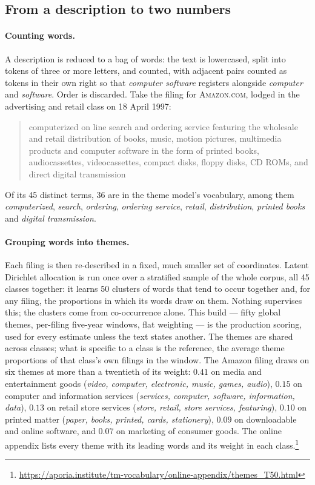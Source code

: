 \subsection{From a description to two numbers}\label{sec:definitions}

\paragraph{Counting words.} A description is reduced to a bag of words: the
text is lowercased, split into tokens of three or more letters, and counted,
with adjacent pairs counted as tokens in their own right so that
\emph{computer software} registers alongside \emph{computer} and
\emph{software}. Order is discarded. Take the filing for \textsc{Amazon.com},
lodged in the advertising and retail class on 18 April 1997:

\begin{quote}\small
computerized on line search and ordering service featuring the wholesale and
retail distribution of books, music, motion pictures, multimedia products and
computer software in the form of printed books, audiocassettes,
videocassettes, compact disks, floppy disks, CD ROMs, and direct digital
transmission
\end{quote}

\noindent Of its 45 distinct terms, 36 are in the theme model's vocabulary,
among them \emph{computerized}, \emph{search}, \emph{ordering},
\emph{ordering service}, \emph{retail}, \emph{distribution}, \emph{printed
books} and \emph{digital transmission}.

\paragraph{Grouping words into themes.} Each filing is then re-described in a
fixed, much smaller set of coordinates. Latent Dirichlet allocation is run
once over a stratified sample of the whole corpus, all 45 classes together: it
learns 50 clusters of words that tend to occur together and, for any filing,
the proportions in which its words draw on them. Nothing supervises this; the
clusters come from co-occurrence alone. This build --- fifty global themes,
per-filing five-year windows, flat weighting --- is the production scoring,
used for every estimate unless the text states another. The themes are
shared across classes;
what is specific to a class is the reference, the average theme proportions
of that class's own filings in the window. The Amazon filing draws on six
themes at more than a twentieth of its weight: $0.41$ on media and
entertainment goods (\emph{video, computer, electronic, music, games,
audio}), $0.15$ on computer and information services (\emph{services,
computer, software, information, data}), $0.13$ on retail store services
(\emph{store, retail, store services, featuring}), $0.10$ on printed matter
(\emph{paper, books, printed, cards, stationery}), $0.09$ on downloadable and
online software, and $0.07$ on marketing of consumer goods. The online
appendix lists every theme with its leading words and its weight in each
class.\footnote{\url{https://aporia.institute/tm-vocabulary/online-appendix/themes_T50.html}}

